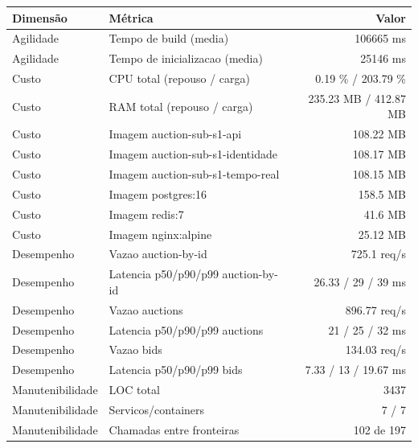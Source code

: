 \begin{quadro}[htb]
  \centering
  \caption{Métricas (auction, subdominio, snapshot-1).}
  \label{qua:metricas-auction-subdominio-snapshot-1}
  \renewcommand{\arraystretch}{1.15}
  \begin{tabular}{|l|l|r|}
    \hline
    \textbf{Dimensão} & \textbf{Métrica} & \textbf{Valor} \\
    \hline
    Agilidade & Tempo de build (media) & 106665 ms \\ \hline
    Agilidade & Tempo de inicializacao (media) & 25146 ms \\ \hline
    Custo & CPU total (repouso / carga) & 0.19 \% / 203.79 \% \\ \hline
    Custo & RAM total (repouso / carga) & 235.23 MB / 412.87 MB \\ \hline
    Custo & Imagem auction-sub-s1-api & 108.22 MB \\ \hline
    Custo & Imagem auction-sub-s1-identidade & 108.17 MB \\ \hline
    Custo & Imagem auction-sub-s1-tempo-real & 108.15 MB \\ \hline
    Custo & Imagem postgres:16 & 158.5 MB \\ \hline
    Custo & Imagem redis:7 & 41.6 MB \\ \hline
    Custo & Imagem nginx:alpine & 25.12 MB \\ \hline
    Desempenho & Vazao auction-by-id & 725.1 req/s \\ \hline
    Desempenho & Latencia p50/p90/p99 auction-by-id & 26.33 / 29 / 39 ms \\ \hline
    Desempenho & Vazao auctions & 896.77 req/s \\ \hline
    Desempenho & Latencia p50/p90/p99 auctions & 21 / 25 / 32 ms \\ \hline
    Desempenho & Vazao bids & 134.03 req/s \\ \hline
    Desempenho & Latencia p50/p90/p99 bids & 7.33 / 13 / 19.67 ms \\ \hline
    Manutenibilidade & LOC total & 3437 \\ \hline
    Manutenibilidade & Servicos/containers & 7 / 7 \\ \hline
    Manutenibilidade & Chamadas entre fronteiras & 102 de 197 \\ \hline
  \end{tabular}
\end{quadro}
